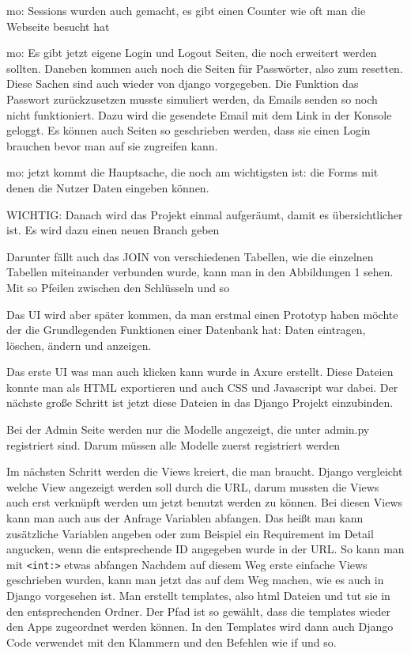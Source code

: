 \documentclass[11pt,a4paper]{report}
\begin{document}
mo: Sessions wurden auch gemacht, es gibt einen Counter wie oft man die Webseite besucht hat

mo: Es gibt jetzt eigene Login und Logout Seiten, die noch erweitert werden sollten. Daneben kommen auch noch die Seiten für Passwörter, also zum resetten. Diese Sachen sind auch wieder von django vorgegeben. Die Funktion das Passwort zurückzusetzen musste simuliert werden, da Emails senden so noch nicht funktioniert. Dazu wird die gesendete Email mit dem Link in der Konsole geloggt. Es können auch Seiten so geschrieben werden, dass sie einen Login brauchen bevor man auf sie zugreifen kann.

mo: jetzt kommt die Hauptsache, die noch am wichtigsten ist: die Forms mit denen die Nutzer Daten eingeben können.

WICHTIG: Danach wird das Projekt einmal aufgeräumt, damit es übersichtlicher ist. Es wird dazu einen neuen Branch geben

Darunter fällt auch das JOIN von verschiedenen Tabellen, wie die einzelnen Tabellen miteinander verbunden wurde, kann man in den Abbildungen 1 sehen.
Mit so Pfeilen zwischen den Schlüsseln und so

Das UI wird aber später kommen, da man erstmal einen Prototyp haben möchte der die Grundlegenden Funktionen einer  Datenbank hat: Daten eintragen, löschen, ändern und anzeigen.

Das erste UI was man auch klicken kann wurde in Axure erstellt. Diese Dateien konnte man als HTML exportieren und auch CSS und Javascript war dabei. Der nächste große Schritt ist jetzt diese Dateien in das Django Projekt einzubinden. 

Bei der Admin Seite werden nur die Modelle angezeigt, die unter admin.py registriert sind. Darum müssen alle Modelle zuerst registriert werden


Im nächsten Schritt werden die Views kreiert, die man braucht. Django vergleicht welche View angezeigt werden soll durch die URL, darum mussten die Views auch erst verknüpft werden um jetzt benutzt werden zu können.
Bei diesen Views kann  man auch aus der Anfrage Variablen abfangen. Das heißt man kann zusätzliche Variablen angeben oder zum Beispiel ein Requirement im Detail angucken, wenn die entsprechende ID angegeben wurde in der URL. So kann man mit \verb|<int:>| etwas abfangen
Nachdem auf diesem Weg erste einfache Views geschrieben wurden, kann man jetzt das auf dem Weg machen, wie es auch in Django vorgesehen ist. Man erstellt templates, also html Dateien und tut sie in den entsprechenden Ordner. Der Pfad ist so gewählt, dass die templates wieder den Apps zugeordnet werden können. In den Templates wird dann auch Django Code verwendet mit den Klammern und den Befehlen wie if und so.
\end{document}
